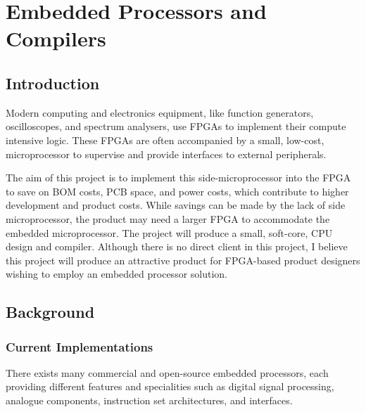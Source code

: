 \documentclass[11pt,a4paper]{report}
\begin{document}
\newpage
\chapter{Embedded Processors and Compilers}
{\hypersetup{linkcolor=black}
\startcontents[chapters]
}

\section{Introduction}
Modern computing and electronics equipment, like function generators, oscilloscopes, and spectrum analysers, use FPGAs to implement their compute intensive logic. These FPGAs are often accompanied by a small, low-cost, microprocessor to supervise and provide interfaces to external peripherals.

The aim of this project is to implement this side-microprocessor into the FPGA to save on BOM costs, PCB  space,  and  power  costs,  which  contribute  to  higher  development  and  product  costs.  While  savings can  be  made  by  the  lack  of  side  microprocessor,  the  product  may  need  a  larger  FPGA  to  accommodate the embedded microprocessor.  The project will produce a small, soft-core, CPU design and compiler. Although there is no direct client in this project, I believe this project will produce an attractive product
for FPGA-based product designers wishing to employ an embedded processor solution.


\section{Background}
\subsection{Current Implementations}\label{current_impl}
There exists many commercial and open-source embedded processors, each providing different features and specialities such as digital signal processing, analogue components, instruction set architectures, and interfaces.
\end{document}
